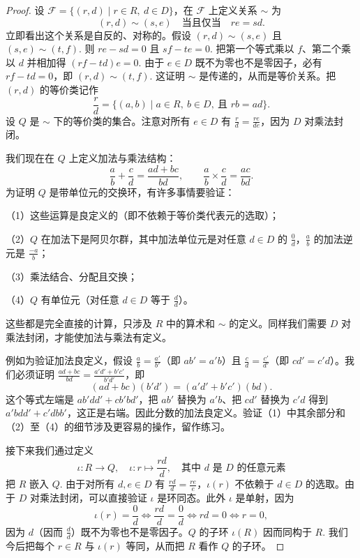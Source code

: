 \begin{proof}
设 \(\mathcal{F} = \{(r, d) \mid r \in R,\ d \in D\}\)，在 \(\mathcal{F}\) 上定义关系 \(\sim\) 为
\[
(r, d) \sim (s, e) \quad \text{当且仅当} \quad re = sd.
\]
立即看出这个关系是自反的、对称的。假设 \((r, d) \sim (s, e)\) 且 \((s, e) \sim (t, f)\). 则 \(re - sd = 0\) 且 \(sf - te = 0\). 把第一个等式乘以 \(f\)、第二个乘以 \(d\) 并相加得 \((rf - td)e = 0\). 由于 \(e \in D\) 既不为零也不是零因子，必有 \(rf - td = 0\)，即 \((r, d) \sim (t, f)\). 这证明 \(\sim\) 是传递的，从而是等价关系。把 \((r, d)\) 的等价类记作
\[
\frac{r}{d} = \{(a, b) \mid a \in R,\ b \in D,\ \text{且 } rb = ad\}.
\]
设 \(Q\) 是 \(\sim\) 下的等价类的集合。注意对所有 \(e \in D\) 有 \(\frac{r}{d} = \frac{re}{de}\)，因为 \(D\) 对乘法封闭。

我们现在在 \(Q\) 上定义加法与乘法结构：
\[
\frac{a}{b} + \frac{c}{d} = \frac{ad+bc}{bd}, \qquad \frac{a}{b} \times \frac{c}{d} = \frac{ac}{bd}.
\]
为证明 \(Q\) 是带单位元的交换环，有许多事情要验证：

（1）这些运算是良定义的（即不依赖于等价类代表元的选取）；

（2）\(Q\) 在加法下是阿贝尔群，其中加法单位元是对任意 \(d \in D\) 的 \(\frac{0}{d}\)，\(\frac{a}{b}\) 的加法逆元是 \(\frac{-a}{b}\)；

（3）乘法结合、分配且交换；

（4）\(Q\) 有单位元（对任意 \(d \in D\) 等于 \(\frac{d}{d}\)）。

这些都是完全直接的计算，只涉及 \(R\) 中的算术和 \(\sim\) 的定义。同样我们需要 \(D\) 对乘法封闭，才能使加法与乘法有定义。

例如为验证加法良定义，假设 \(\frac{a}{b} = \frac{a'}{b'}\)（即 \(ab' = a'b\)）且 \(\frac{c}{d} = \frac{c'}{d'}\)（即 \(cd' = c'd\)）。我们必须证明 \(\frac{ad+bc}{bd} = \frac{a'd'+b'c'}{b'd'}\)，即
\[
(ad+bc)(b'd') = (a'd'+b'c')(bd).
\]
这个等式左端是 \(ab'dd' + cb'bd'\)，把 \(ab'\) 替换为 \(a'b\)、把 \(cd'\) 替换为 \(c'd\) 得到 \(a'bdd' + c'dbb'\)，这正是右端。因此分数的加法良定义。验证（1）中其余部分和（2）至（4）的细节涉及更容易的操作，留作练习。

接下来我们通过定义
\[
\iota : R \to Q, \quad \iota : r \mapsto \frac{rd}{d}, \quad \text{其中 } d \text{ 是 } D \text{ 的任意元素}
\]
把 \(R\) 嵌入 \(Q\). 由于对所有 \(d, e \in D\) 有 \(\frac{rd}{d} = \frac{re}{e}\)，\(\iota(r)\) 不依赖于 \(d \in D\) 的选取。由于 \(D\) 对乘法封闭，可以直接验证 \(\iota\) 是环同态。此外 \(\iota\) 是单射，因为
\[
\iota(r) = \frac{0}{d} \iff \frac{rd}{d} = \frac{0}{d} \iff rd = 0 \iff r = 0,
\]
因为 \(d\)（因而 \(\frac{d}{d}\)）既不为零也不是零因子。\(Q\) 的子环 \(\iota(R)\) 因而同构于 \(R\). 我们今后把每个 \(r \in R\) 与 \(\iota(r)\) 等同，从而把 \(R\) 看作 \(Q\) 的子环。


\end{proof}
